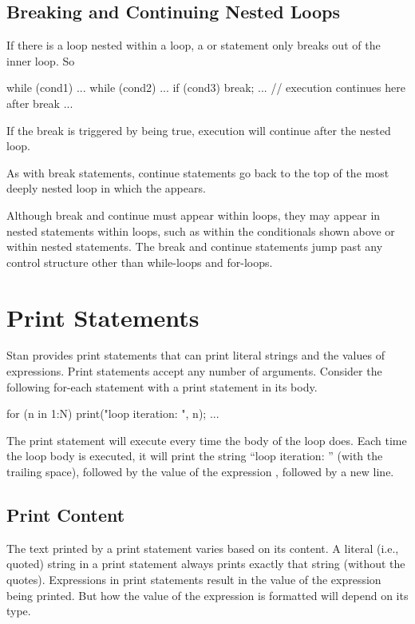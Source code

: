 \subsection{Breaking and Continuing Nested Loops}

If there is a loop nested within a loop, a  or
 statement only breaks out of the inner loop. So
%
\begin{stancode}
while (cond1) {
  ...
  while (cond2) {
    ...
    if (cond3) break;
    ...
  }
  // execution continues here after break
  ...
}
\end{stancode}
%
If the break is triggered by  being true, execution will
continue after the nested loop.

As with break statements, continue statements go back to the top of
the most deeply nested loop in which the  appears.

Although break and continue must appear within loops, they may appear
in nested statements within loops, such as within the conditionals
shown above or within nested statements.  The break and continue
statements jump past any control structure other than while-loops and
for-loops.

\section{Print Statements}\label{print-statements.section}

Stan provides print statements that can print literal strings and the
values of expressions.  Print statements accept any number of
arguments.  Consider the following for-each statement with a print
statement in its body.
%
\begin{stancode}
for (n in 1:N) { print("loop iteration: ", n); ... }
\end{stancode}
%
The print statement will execute every time the body of the loop does.
Each time the loop body is executed, it will print the string ``loop iteration:
'' (with the trailing space), followed by the value of the expression
, followed by a new line.

\subsection{Print Content}

The text printed by a print statement varies based on its content.  A
literal (i.e., quoted) string in a print statement always prints
exactly that string (without the quotes).  Expressions in print
statements result in the value of the expression being printed.
But how the value of the expression is formatted will depend on its type.

